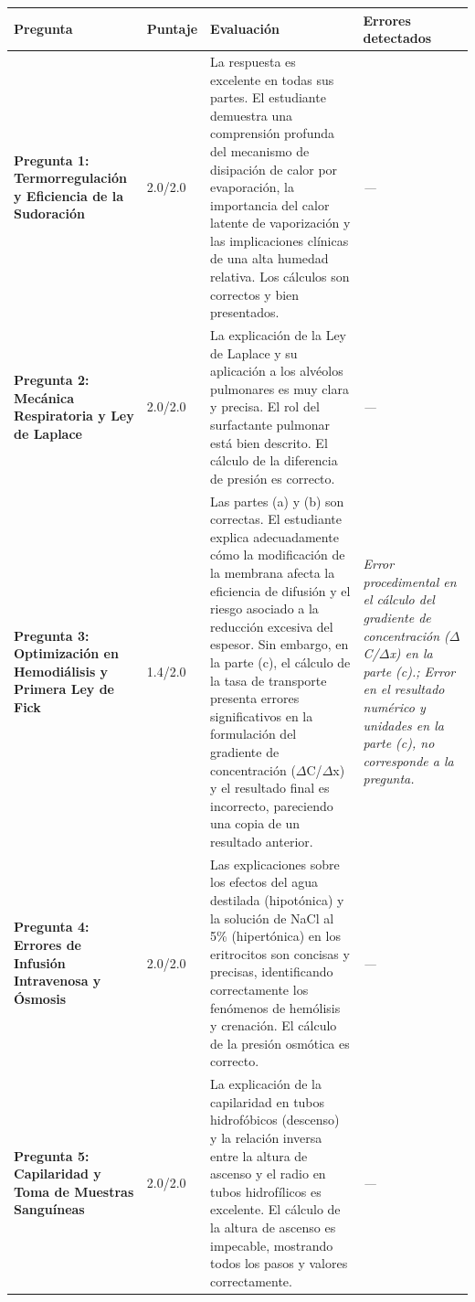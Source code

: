 \documentclass[11pt,a4paper]{article}
\begin{document}
\begin{longtable}{>{\bfseries}p{2.8cm} p{1.6cm} p{7.0cm} p{2.8cm}}
  \toprule
  \textbf{Pregunta} & \textbf{Puntaje} & \textbf{Evaluación} & \textbf{Errores detectados} \\
  \midrule
  \endhead
  \bottomrule
  \endfoot
    \textbf{Pregunta 1: Termorregulación y Eficiencia de la Sudoración} & 2.0/2.0 & La respuesta es excelente en todas sus partes. El estudiante demuestra una comprensión profunda del mecanismo de disipación de calor por evaporación, la importancia del calor latente de vaporización y las implicaciones clínicas de una alta humedad relativa. Los cálculos son correctos y bien presentados. & \textit{---} \\
    \midrule
    \textbf{Pregunta 2: Mecánica Respiratoria y Ley de Laplace} & 2.0/2.0 & La explicación de la Ley de Laplace y su aplicación a los alvéolos pulmonares es muy clara y precisa. El rol del surfactante pulmonar está bien descrito. El cálculo de la diferencia de presión es correcto. & \textit{---} \\
    \midrule
    \textbf{Pregunta 3: Optimización en Hemodiálisis y Primera Ley de Fick} & 1.4/2.0 & Las partes (a) y (b) son correctas. El estudiante explica adecuadamente cómo la modificación de la membrana afecta la eficiencia de difusión y el riesgo asociado a la reducción excesiva del espesor. Sin embargo, en la parte (c), el cálculo de la tasa de transporte presenta errores significativos en la formulación del gradiente de concentración ($\Delta$C/$\Delta$x) y el resultado final es incorrecto, pareciendo una copia de un resultado anterior. & \textit{Error procedimental en el cálculo del gradiente de concentración ($\Delta$C/$\Delta$x) en la parte (c).; Error en el resultado numérico y unidades en la parte (c), no corresponde a la pregunta.} \\
    \midrule
    \textbf{Pregunta 4: Errores de Infusión Intravenosa y Ósmosis} & 2.0/2.0 & Las explicaciones sobre los efectos del agua destilada (hipotónica) y la solución de NaCl al 5\% (hipertónica) en los eritrocitos son concisas y precisas, identificando correctamente los fenómenos de hemólisis y crenación. El cálculo de la presión osmótica es correcto. & \textit{---} \\
    \midrule
    \textbf{Pregunta 5: Capilaridad y Toma de Muestras Sanguíneas} & 2.0/2.0 & La explicación de la capilaridad en tubos hidrofóbicos (descenso) y la relación inversa entre la altura de ascenso y el radio en tubos hidrofílicos es excelente. El cálculo de la altura de ascenso es impecable, mostrando todos los pasos y valores correctamente. & \textit{---} \\
    \midrule
\end{longtable}
\end{document}
